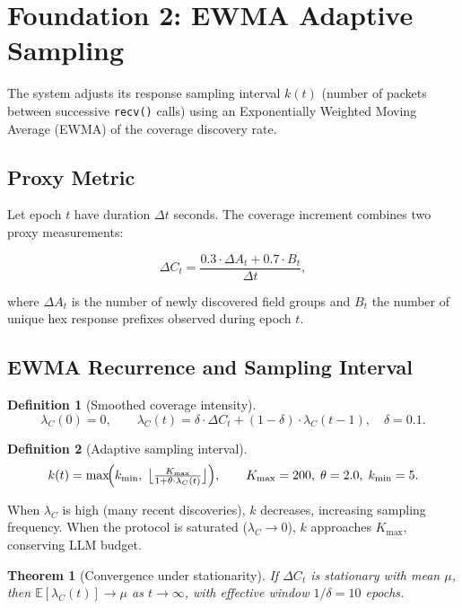 \documentclass[11pt,a4paper]{article}
\newtheorem{definition}{Definition}
\newtheorem{theorem}{Theorem}
\begin{document}
\section{Foundation 2: EWMA Adaptive Sampling}

The system adjusts its response sampling interval $k(t)$ (number of packets
between successive \texttt{recv()} calls) using an Exponentially Weighted
Moving Average (EWMA) of the coverage discovery rate.

\subsection{Proxy Metric}

Let epoch $t$ have duration $\Delta t$ seconds. The coverage increment
combines two proxy measurements:

\[
\Delta C_t = \frac{0.3 \cdot \Delta A_t + 0.7 \cdot B_t}{\Delta t},
\]

where $\Delta A_t$ is the number of newly discovered field groups and $B_t$
the number of unique hex response prefixes observed during epoch $t$.

\subsection{EWMA Recurrence and Sampling Interval}

\begin{definition}[Smoothed coverage intensity]
\[
\lambda_C(0) = 0,\qquad
\lambda_C(t) = \delta \cdot \Delta C_t + (1 - \delta) \cdot \lambda_C(t-1),
\quad \delta = 0.1.
\]
\end{definition}

\begin{definition}[Adaptive sampling interval]
\[
k(t) = \max\!\Bigl(k_{\min},\;
       \bigl\lfloor \tfrac{K_{\max}}{1 + \theta \cdot \lambda_C(t)}
       \bigr\rfloor \Bigr),
\qquad
K_{\max} = 200,\; \theta = 2.0,\; k_{\min} = 5.
\]
\end{definition}

When $\lambda_C$ is high (many recent discoveries), $k$ decreases, increasing
sampling frequency. When the protocol is saturated ($\lambda_C \to 0$),
$k$ approaches $K_{\max}$, conserving LLM budget.

\begin{theorem}[Convergence under stationarity]
If $\Delta C_t$ is stationary with mean $\mu$, then
$\mathbb{E}[\lambda_C(t)] \to \mu$ as $t \to \infty$, with effective
window $1/\delta = 10$ epochs.
\end{theorem}
\end{document}

